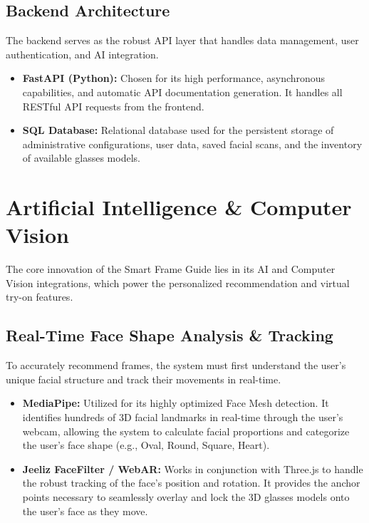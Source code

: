 \documentclass[12pt,a4paper]{article}
\begin{document}
\subsection{Backend Architecture}
The backend serves as the robust API layer that handles data management, user authentication, and AI integration.
\begin{itemize}[label=\textcolor{primary}{$\bullet$}]
    \item \textbf{FastAPI (Python):} Chosen for its high performance, asynchronous capabilities, and automatic API documentation generation. It handles all RESTful API requests from the frontend.
    \item \textbf{SQL Database:} Relational database used for the persistent storage of administrative configurations, user data, saved facial scans, and the inventory of available glasses models.
\end{itemize}

\section{Artificial Intelligence \& Computer Vision}
The core innovation of the Smart Frame Guide lies in its AI and Computer Vision integrations, which power the personalized recommendation and virtual try-on features.

\subsection{Real-Time Face Shape Analysis \& Tracking}
To accurately recommend frames, the system must first understand the user's unique facial structure and track their movements in real-time.
\begin{itemize}[label=\textcolor{primary}{$\bullet$}]
    \item \textbf{MediaPipe:} Utilized for its highly optimized Face Mesh detection. It identifies hundreds of 3D facial landmarks in real-time through the user's webcam, allowing the system to calculate facial proportions and categorize the user's face shape (e.g., Oval, Round, Square, Heart).
    \item \textbf{Jeeliz FaceFilter / WebAR:} Works in conjunction with Three.js to handle the robust tracking of the face's position and rotation. It provides the anchor points necessary to seamlessly overlay and lock the 3D glasses models onto the user's face as they move.
\end{itemize}
\end{document}
